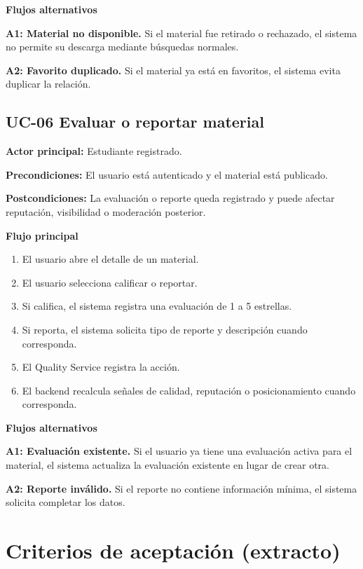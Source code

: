 \documentclass[12pt,a4paper]{article}
\begin{document}
\noindent\textbf{Flujos alternativos}

\noindent\textbf{A1: Material no disponible.} Si el material fue retirado o rechazado, el sistema no permite su descarga mediante búsquedas normales.

\noindent\textbf{A2: Favorito duplicado.} Si el material ya está en favoritos, el sistema evita duplicar la relación.

\subsection{UC-06 Evaluar o reportar material}

\noindent\textbf{Actor principal:} Estudiante registrado.

\noindent\textbf{Precondiciones:} El usuario está autenticado y el material está publicado.

\noindent\textbf{Postcondiciones:} La evaluación o reporte queda registrado y puede afectar reputación, visibilidad o moderación posterior.

\noindent\textbf{Flujo principal}

\begin{enumerate}
    \item El usuario abre el detalle de un material.
    \item El usuario selecciona calificar o reportar.
    \item Si califica, el sistema registra una evaluación de 1 a 5 estrellas.
    \item Si reporta, el sistema solicita tipo de reporte y descripción cuando corresponda.
    \item El Quality Service registra la acción.
    \item El backend recalcula señales de calidad, reputación o posicionamiento cuando corresponda.
\end{enumerate}

\noindent\textbf{Flujos alternativos}

\noindent\textbf{A1: Evaluación existente.} Si el usuario ya tiene una evaluación activa para el material, el sistema actualiza la evaluación existente en lugar de crear otra.

\noindent\textbf{A2: Reporte inválido.} Si el reporte no contiene información mínima, el sistema solicita completar los datos.

\section{Criterios de aceptación (extracto)}
\end{document}
